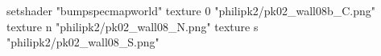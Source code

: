 setshader "bumpspecmapworld"
    texture 0 "philipk2/pk02_wall08b_C.png"
    texture n "philipk2/pk02_wall08_N.png"
    texture s "philipk2/pk02_wall08_S.png"